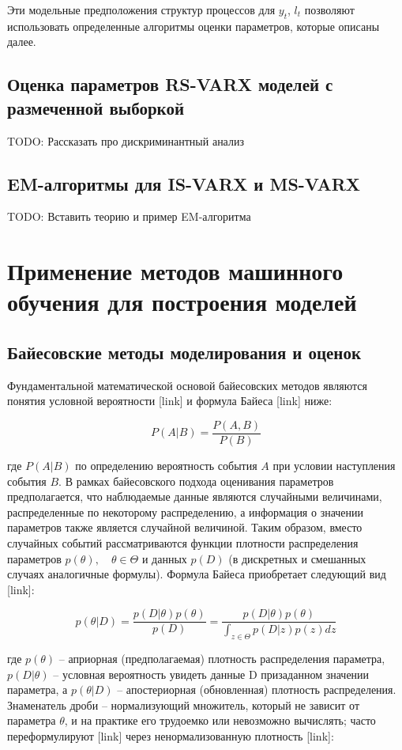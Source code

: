 \documentclass[a4paper,14pt]{extreport}
\begin{document}
Эти модельные предположения структур процессов для $y_t$, $l_t$ позволяют использовать определенные алгоритмы оценки параметров, которые описаны далее.


\section{Оценка параметров RS-VARX моделей с размеченной выборкой}

TODO: Рассказать про дискриминантный анализ


\section{EM-алгоритмы для IS-VARX и MS-VARX}

TODO: Вставить теорию и пример EM-алгоритма


\chapter{Применение методов машинного обучения для построения моделей}


\section{Байесовские методы моделирования и оценок}

Фундаментальной математической основой байесовских методов являются понятия условной вероятности [link] и формула Байеса [link] ниже:

\[  P(A|B)=\frac{P(A,B)}{P(B)}  \]

где $P(A|B)$ по определению вероятность события $A$ при условии наступления события $B$. В рамках байесовского подхода оценивания параметров предполагается, что наблюдаемые данные являются случайными величинами, распределенные по некоторому распределению, а информация о значении параметров также является случайной величиной. Таким образом, вместо случайных событий рассматриваются функции плотности распределения параметров $p(\theta), \quad \theta \in \Theta$ и данных $p(D)$ (в дискретных и смешанных случаях аналогичные формулы). Формула Байеса приобретает следующий вид [link]:

\[
	p(\theta|D) = \frac{p(D|\theta) p(\theta)}{p(D)} = \frac{p(D|\theta) p(\theta)}{\int_{z\in\Theta}{p(D|z)p(z)dz}}
\]

где $p(\theta)$ -- априорная (предполагаемая) плотность распределения параметра, $p(D|\theta)$ -- условная вероятность увидеть данные D призаданном значении параметра, а $p(\theta|D)$ -- апостериорная (обновленная) плотность распределения. Знаменатель дроби -- нормализующий множитель, который не зависит от параметра $\theta$, и на практике его трудоемко или невозможно вычислять; часто переформулируют [link] через ненормализованную плотность [link]:
\end{document}
